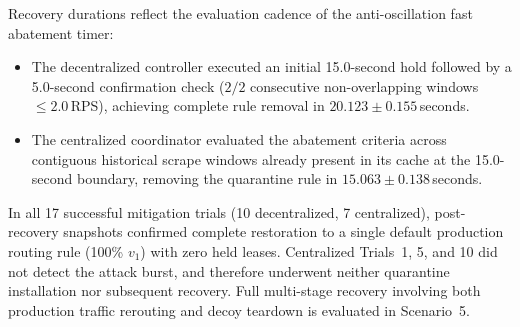 Recovery durations reflect the evaluation cadence of the anti-oscillation fast abatement timer:
\begin{itemize}
    \item The decentralized controller executed an initial 15.0-second hold followed by a 5.0-second confirmation check ($2/2$ consecutive non-overlapping windows $\le 2.0$\,RPS), achieving complete rule removal in $20.123\pm 0.155$\,seconds.
    \item The centralized coordinator evaluated the abatement criteria across contiguous historical scrape windows already present in its cache at the 15.0-second boundary, removing the quarantine rule in $15.063\pm 0.138$\,seconds.
\end{itemize}
In all 17 successful mitigation trials (10 decentralized, 7 centralized), post-recovery snapshots confirmed complete restoration to a single default production routing rule (100\% $v_1$) with zero held leases. Centralized Trials~1, 5, and 10 did not detect the attack burst, and therefore underwent neither quarantine installation nor subsequent recovery. Full multi-stage recovery involving both production traffic rerouting and decoy teardown is evaluated in Scenario~5.

